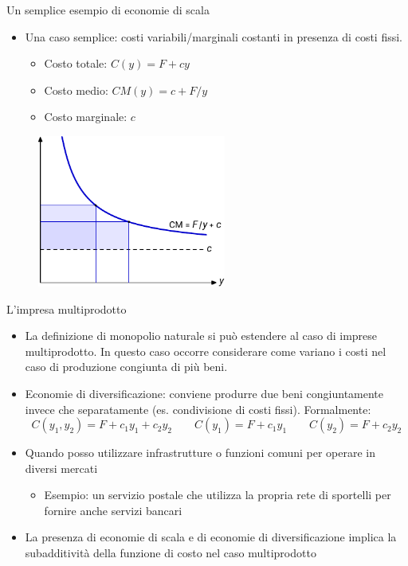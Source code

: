 \documentclass[aspectratio=149,11pt]{beamer}
\begin{document}
\begin{frame}{Un semplice esempio di economie di scala}
\begin{itemize}
\item Una caso semplice: costi variabili/marginali costanti in presenza di costi fissi.
\begin{itemize}
\item Costo totale: $C(y)=F+cy$
\item Costo medio: $CM(y)=c+F/y$
\item Costo marginale: $c$
\end{itemize}
\end{itemize}
\begin{figure}[htbp]
\centering
\includegraphics[height=5cm]{./figure/monopolio-naturale-1-color.pdf}
\end{figure}
\end{frame}


\begin{frame}{L'impresa multiprodotto}
\begin{itemize}
\item La definizione di monopolio naturale si può estendere al caso di imprese
multiprodotto. In questo caso occorre considerare come variano i costi nel
caso di produzione congiunta di più beni.
\item \alert{Economie di diversificazione}: conviene produrre due beni congiuntamente
invece che separatamente (es. condivisione di costi fissi). Formalmente:
\begin{equation*}
 C(y_1,y_2)=F + c_1y_1+c_2y_2 \qquad C(y_1)=F + c_1y_1 \qquad  C(y_2)=F + c_2y_2 
\end{equation*}
\item Quando posso utilizzare infrastrutture o funzioni comuni per operare in diversi mercati
\begin{itemize}
\item Esempio: un servizio postale che utilizza la propria rete di sportelli per
fornire anche servizi bancari
\end{itemize}
\item La presenza di economie di scala e di economie di diversificazione implica
la subadditività della funzione di costo nel caso multiprodotto
\end{itemize}
\end{frame}
\end{document}
